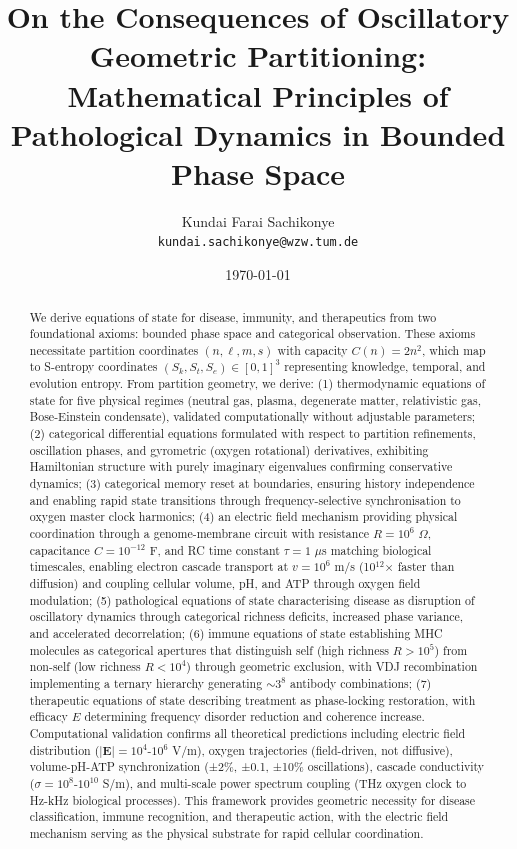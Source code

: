 \documentclass[11pt,twocolumn,a4paper]{article}
\title{On the Consequences of Oscillatory Geometric Partitioning: Mathematical Principles of Pathological Dynamics in Bounded Phase Space}
\author{
Kundai Farai Sachikonye\\
\texttt{kundai.sachikonye@wzw.tum.de}
}
\date{\today}
\theoremstyle{definition}
\theoremstyle{remark}
\newcommand{\Sk}{S_k}
\newcommand{\St}{S_t}
\newcommand{\Se}{S_e}
\begin{document}
\maketitle

\begin{abstract}
We derive equations of state for disease, immunity, and therapeutics from two foundational axioms: bounded phase space and categorical observation. These axioms necessitate partition coordinates $(n,\ell,m,s)$ with capacity $C(n) = 2n^2$, which map to S-entropy coordinates $(\Sk,\St,\Se) \in [0,1]^3$ representing knowledge, temporal, and evolution entropy. From partition geometry, we derive: (1) thermodynamic equations of state for five physical regimes (neutral gas, plasma, degenerate matter, relativistic gas, Bose-Einstein condensate), validated computationally without adjustable parameters; (2) categorical differential equations formulated with respect to partition refinements, oscillation phases, and gyrometric (oxygen rotational) derivatives, exhibiting Hamiltonian structure with purely imaginary eigenvalues confirming conservative dynamics; (3) categorical memory reset at boundaries, ensuring history independence and enabling rapid state transitions through frequency-selective synchronisation to oxygen master clock harmonics; (4) an electric field mechanism providing physical coordination through a genome-membrane circuit with resistance $R = 10^6$ $\Omega$, capacitance $C = 10^{-12}$ F, and RC time constant $\tau = 1$ $\mu$s matching biological timescales, enabling electron cascade transport at $v = 10^6$ m/s (10$^{12}$× faster than diffusion) and coupling cellular volume, pH, and ATP through oxygen field modulation; (5) pathological equations of state characterising disease as disruption of oscillatory dynamics through categorical richness deficits, increased phase variance, and accelerated decorrelation; (6) immune equations of state establishing MHC molecules as categorical apertures that distinguish self (high richness $R > 10^5$) from non-self (low richness $R < 10^4$) through geometric exclusion, with VDJ recombination implementing a ternary hierarchy generating $\sim 3^8$ antibody combinations; (7) therapeutic equations of state describing treatment as phase-locking restoration, with efficacy $E$ determining frequency disorder reduction and coherence increase. Computational validation confirms all theoretical predictions including electric field distribution ($|\mathbf{E}| = 10^4$-$10^6$ V/m), oxygen trajectories (field-driven, not diffusive), volume-pH-ATP synchronization (±2\%, ±0.1, ±10\% oscillations), cascade conductivity ($\sigma = 10^{8}$-$10^{10}$ S/m), and multi-scale power spectrum coupling (THz oxygen clock to Hz-kHz biological processes). This framework provides geometric necessity for disease classification, immune recognition, and therapeutic action, with the electric field mechanism serving as the physical substrate for rapid cellular coordination.
\end{abstract}
\end{document}
